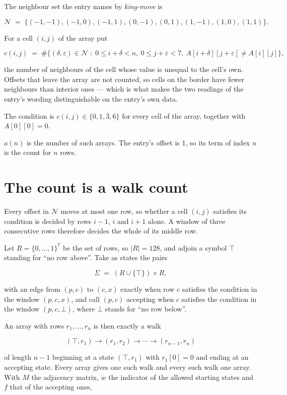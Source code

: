 \documentclass[11pt]{article}
\theoremstyle{definition}
\begin{document}
The neighbour set the entry names by {\itshape king-move} is

\[\mathcal{N} \;=\; \{(-1,-1), (-1,0), (-1,1), (0,-1), (0,1), (1,-1), (1,0), (1,1)\}.\]

For a cell $(i,j)$ of the array put

\[c(i,j) \;=\; \#\bigl\{(\delta,\varepsilon)\in\mathcal{N} \;:\; 0\le i+\delta<n,\ 0\le j+\varepsilon<7,\ A[i+\delta][j+\varepsilon] \neq A[i][j]\bigr\},\]

the number of neighbours of the cell whose value is unequal to the cell's own. Offsets that leave the array are not counted, so cells on the border have fewer neighbours than interior ones --- which is what makes the two readings of the entry's wording distinguishable on the entry's own data.

The condition is $c(i,j) \in \{0, 1, 3, 6\}$ for every cell of the array, together with $A[0][0]=0$.

$a(n)$ is the number of such arrays. The entry's offset is 1, so its term of index $n$ is the count for $n$ rows.

\section{The count is a walk count}

Every offset in $\mathcal{N}$ moves at most one row, so whether a cell $(i,j)$ satisfies its condition is decided by rows $i-1$, $i$ and $i+1$ alone. A window of three consecutive rows therefore decides the whole of its middle row.

Let $R = \{0,\dots,1\}^{7}$ be the set of rows, so $|R| = 128$, and adjoin a symbol $\top$ standing for ``no row above''. Take as states the pairs

\[\Sigma \;=\; (R \cup \{\top\}) \times R,\]

with an edge from $(p,c)$ to $(c,x)$ exactly when row $c$ satisfies the condition in the window $(p,c,x)$, and call $(p,c)$ accepting when $c$ satisfies the condition in the window $(p,c,\bot)$, where $\bot$ stands for ``no row below''.

An array with rows $r_1,\dots,r_n$ is then exactly a walk

\[(\top,r_1) \to (r_1,r_2) \to \cdots \to (r_{n-1},r_n)\]

of length $n-1$ beginning at a state $(\top,r_1)$ with $r_1[0]=0$ and ending at an accepting state. Every array gives one such walk and every such walk one array. With $M$ the adjacency matrix, $w$ the indicator of the allowed starting states and $f$ that of the accepting ones,
\end{document}
